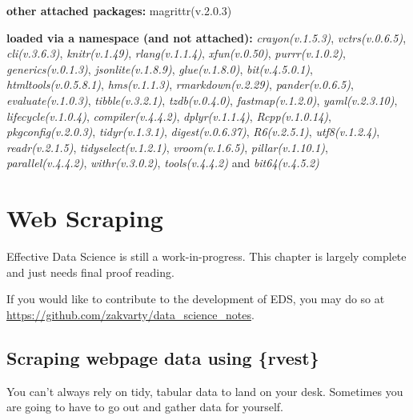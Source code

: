 \documentclass[
  letterpaper,
  DIV=11,
  numbers=noendperiod]{scrreprt}
\begin{document}
\textbf{other attached packages:} magrittr(v.2.0.3)

\textbf{loaded via a namespace (and not attached):}
\emph{crayon(v.1.5.3)}, \emph{vctrs(v.0.6.5)}, \emph{cli(v.3.6.3)},
\emph{knitr(v.1.49)}, \emph{rlang(v.1.1.4)}, \emph{xfun(v.0.50)},
\emph{purrr(v.1.0.2)}, \emph{generics(v.0.1.3)},
\emph{jsonlite(v.1.8.9)}, \emph{glue(v.1.8.0)}, \emph{bit(v.4.5.0.1)},
\emph{htmltools(v.0.5.8.1)}, \emph{hms(v.1.1.3)},
\emph{rmarkdown(v.2.29)}, \emph{pander(v.0.6.5)},
\emph{evaluate(v.1.0.3)}, \emph{tibble(v.3.2.1)}, \emph{tzdb(v.0.4.0)},
\emph{fastmap(v.1.2.0)}, \emph{yaml(v.2.3.10)},
\emph{lifecycle(v.1.0.4)}, \emph{compiler(v.4.4.2)},
\emph{dplyr(v.1.1.4)}, \emph{Rcpp(v.1.0.14)}, \emph{pkgconfig(v.2.0.3)},
\emph{tidyr(v.1.3.1)}, \emph{digest(v.0.6.37)}, \emph{R6(v.2.5.1)},
\emph{utf8(v.1.2.4)}, \emph{readr(v.2.1.5)}, \emph{tidyselect(v.1.2.1)},
\emph{vroom(v.1.6.5)}, \emph{pillar(v.1.10.1)},
\emph{parallel(v.4.4.2)}, \emph{withr(v.3.0.2)}, \emph{tools(v.4.4.2)}
and \emph{bit64(v.4.5.2)}

\chapter{Web Scraping}\label{data-webscraping}

\begin{tcolorbox}[enhanced jigsaw, coltitle=black, opacityback=0, left=2mm, titlerule=0mm, breakable, colback=white, opacitybacktitle=0.6, colbacktitle=quarto-callout-note-color!10!white, bottomtitle=1mm, toptitle=1mm, colframe=quarto-callout-note-color-frame, bottomrule=.15mm, leftrule=.75mm, title=\textcolor{quarto-callout-note-color}{\faInfo}\hspace{0.5em}{Note}, toprule=.15mm, arc=.35mm, rightrule=.15mm]

Effective Data Science is still a work-in-progress. This chapter is
largely complete and just needs final proof reading.

If you would like to contribute to the development of EDS, you may do so
at \url{https://github.com/zakvarty/data_science_notes}.

\end{tcolorbox}

\section{Scraping webpage data using
\{rvest\}}\label{scraping-webpage-data-using-rvest}

You can't always rely on tidy, tabular data to land on your desk.
Sometimes you are going to have to go out and gather data for yourself.
\end{document}
